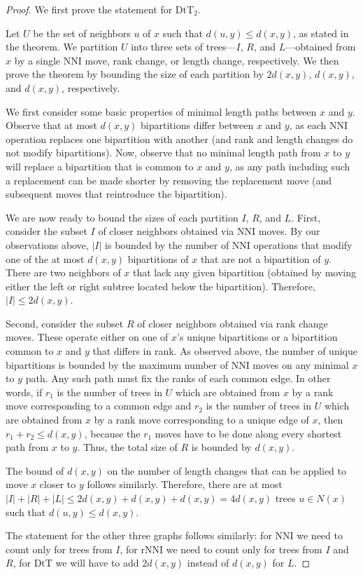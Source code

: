 \documentclass{amsart}
\theoremstyle{definition}
\newcommand{\nni}{\mathrm{NNI}}
\newcommand{\rnni}{\mathrm{rNNI}}
\newcommand{\dtt}{\mathrm{DtT}}
\begin{document}
\begin{proof}
We first prove the statement for $\dtt_2$.

Let $U$ be the set of neighbors $u$ of $x$ such that $d(u,y) \le d(x,y)$, as stated in the theorem.
We partition $U$ into three sets of trees---$I$, $R$, and $L$---obtained from $x$ by a single NNI move, rank change, or length change, respectively.
We then prove the theorem by bounding the size of each partition by $2d(x,y)$, $d(x,y)$, and $d(x,y)$, respectively.

We first consider some basic properties of minimal length paths between $x$ and $y$.
Observe that at most $d(x,y)$ bipartitions differ between $x$ and $y$, as each NNI operation replaces one bipartition with another (and rank and length changes do not modify bipartitions).
Now, observe that no minimal length path from $x$ to $y$ will replace a bipartition that is common to $x$ and $y$, as any path including such a replacement can be made shorter by removing the replacement move (and subsequent moves that reintroduce the bipartition).

We are now ready to bound the sizes of each partition $I$, $R$, and $L$.
First, consider the subset $I$ of closer neighbors obtained via NNI moves.
By our observations above, $|I|$ is bounded by the number of NNI operations that modify one of the at most $d(x,y)$ bipartitions of $x$ that are not a bipartition of $y$.
There are two neighbors of $x$ that lack any given bipartition (obtained by moving either the left or right subtree located below the bipartition).
Therefore, $|I| \le 2d(x,y)$.

Second, consider the subset $R$ of closer neighbors obtained via rank change moves.
These operate either on one of $x$'s unique bipartitions or a bipartition common to $x$ and $y$ that differs in rank.
As observed above, the number of unique bipartitions is bounded by the maximum number of NNI moves on any minimal $x$ to $y$ path.
Any such path must fix the ranks of each common edge.
In other words, if $r_1$ is the number of trees in $U$ which are obtained from $x$ by a rank move corresponding to a common edge and $r_2$ is the number of trees in $U$ which are obtained from $x$ by a rank move corresponding to a unique edge of $x$, then $r_1 + r_2 \leq d(x,y)$, because the $r_1$ moves have to be done along every shortest path from $x$ to $y$.
Thus, the total size of $R$ is bounded by $d(x,y)$.

The bound of $d(x,y)$ on the number of length changes that can be applied to move $x$ closer to $y$ follows similarly.
Therefore, there are at most $|I| + |R| + |L| \le 2d(x,y) + d(x,y) + d(x,y) = 4d(x,y)$ trees $u \in N(x)$ such that $d(u, y) \le d(x, y)$.

The statement for the other three graphs follows similarly: for $\nni$ we need to count only for trees from $I$, for $\rnni$ we need to count only for trees from $I$ and $R$, for $\dtt$ we will have to add $2d(x,y)$ instead of $d(x,y)$ for $L$.
\end{proof}
\end{document}
